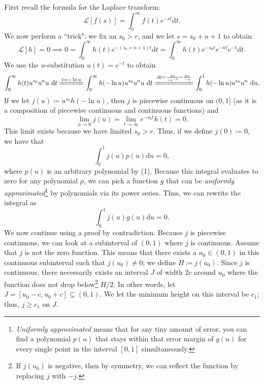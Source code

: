 \documentclass[12pt]{article}
\theoremstyle{plain}
\theoremstyle{definition}
\begin{document}
First recall the formula for the Laplace transform:
\[
\mathcal{L}[f(s)]=\int_{0}^{\infty}f(t)e^{-st} \mathrm{d}t.
\]
We now perform a ``trick": we fix an $s_0>r$, and we let $s=s_0 + n + 1$ to obtain
\begin{equation*} 
    \mathcal{L}[h]=0 \implies 0=\int_{0}^{\infty}h(t)e^{-(s_0+n+1)t}\mathrm{d}t = \int_{0}^{\infty}h(t)e^{-s_0t}e^{-nt}e^{-t}\mathrm{d}t.
\end{equation*}
We use the $u$-substitution $u(t)=e^{-t}$ to obtain
\begin{equation} \setcounter{equation}{1}
    \int_{0}^{\infty} h(t)u^{s_0}u^nu \ \mathrm{d}t \xlongequal{t=-\ln u} \int_{0}^{\infty} h(-\ln u)u^{s_0}u^nu \ \mathrm{d}t \xlongequal{\mathrm{d}t=\frac{\mathrm{d}u}{-e^{-t}}=\frac{\mathrm{d}u}{-u}} \int_{0}^{1} h(-\ln u)u^{s_0}u^n \ \mathrm{d}u.
\end{equation}
If we let $j(u)\coloneq u^{s_0}h(-\ln u)$, then $j$ is piecewise continuous on $(0,1]$ (as it is a composition of piecewise continuous and continuous functions) and 
\[
\lim_{u\to 0} j(u) = \lim_{t\to \infty} e^{-s_0 t}h(t)=0.
\]
This limit exists because we have limited $s_0>r$. Thus, if we define $j(0)\coloneq 0$, we have that
\begin{equation*}
    \int_{0}^{1}j(u)p(u) \mathrm{d}u=0,
\end{equation*}
where $p(u)$ is an arbitrary polynomial by (1). Because this integral evaluates to zero for any polynomial $p$, we can pick a function $g$ that can be \emph{uniformly approximated}\footnote{\emph{Uniformly approximated} means that for any tiny amount of error, you can find a polynomial $p(u)$ that stays within that error margin of $g(u)$ for every single point in the interval $[0, 1]$ simultaneously.} by polynomials via its power series. Thus, we can rewrite the integral as
\begin{equation}
    \int_{0}^{1}j(u)g(u)\mathrm{d}u=0.
\end{equation}
We now continue using a proof by contradiction. Because $j$ is piecewise continuous, we can look at a subinterval of $(0,1)$ where $j$ is continuous. Assume that $j$ is not the zero function. This means that there exists a $u_0\in (0,1)$ in this continuous subinterval such that $j(u_0)\ne 0$; we define $H\coloneq j(u_0)$. Since $j$ is continuous, there necessarily exists an interval $J$ of width $2c$ around $u_0$ where the function does not drop below\footnote{If $j(u_0)$ is negative, then by symmetry, we can reflect the function by replacing $j$ with $-j$.} $H/2$. In other words, let $J=[u_0-c, u_0+c]\subseteq (0,1)$. We let the minimum height on this interval be $c_1$; thus, $j\geq c_1$ on $J$.
\end{document}
